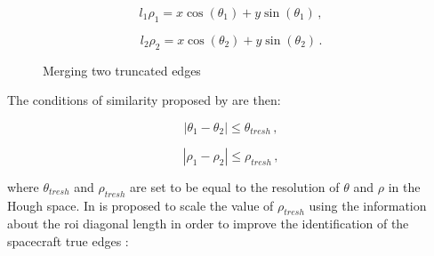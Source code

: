 \begin{equation}
  l_1 \rho_1 = x \cos (\theta_1) +  y \sin (\theta_1) \,,
\end{equation}

\begin{equation}
  l_2 \rho_2 = x \cos (\theta_2) +  y \sin (\theta_2) \,.
\end{equation}

\begin{figure}[htbp]
  \centering
  \qquad
  \qquad
  \caption{Merging two truncated edges \cite{Sharma2018}}
  \label{fig:mergeEdges}
\end{figure}

The conditions of similarity proposed by \cite{Sharma2018} are then:

\begin{equation}
  |\theta_1 - \theta_2| \leqslant \theta_{tresh} \,,
\end{equation}

\begin{equation}
  |\rho_1 - \rho_2| \leqslant \rho_{tresh} \,,
\end{equation}

where $\theta_{tresh}$ and $\rho_{tresh}$ are set to be equal to the resolution of $\theta$ and $\rho$ in the Hough space. In \cite{fracchio2019} is proposed to scale the value of $\rho_{tresh}$ using the information about the \acrshort{roi} diagonal length in order to improve the identification of the spacecraft true edges :

